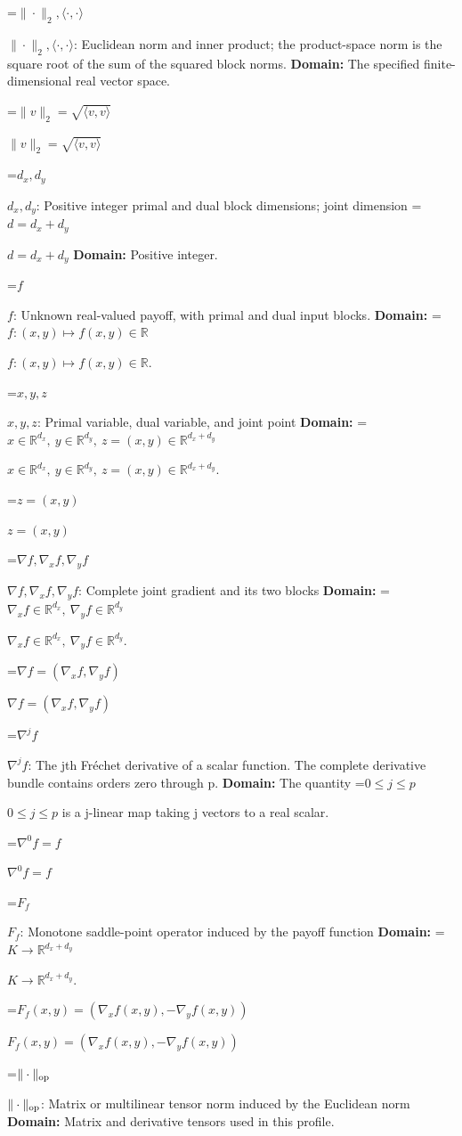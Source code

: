 \documentclass[10pt,a4paper]{article}
\newcommand{\AtlasMath}[1]{\par\begingroup\centering\setbox0=\hbox{$\displaystyle #1$}\ifdim\wd0>1.4\linewidth\typeout{ATLAS WIDE FORMULA: \the\wd0}\fi\ifdim\wd0>\linewidth\resizebox{\linewidth}{!}{\box0}\else\box0\fi\par\endgroup}
\newcommand{\AtlasInlineMath}[1]{\begingroup\setbox0=\hbox{$#1$}\ifdim\wd0>.4\linewidth\endgroup\AtlasMath{#1}\else\endgroup$#1$\fi}
\begin{document}
\AtlasInlineMath{\|\cdot\|_2,\langle\cdot,\cdot\rangle}: Euclidean norm and inner product; the product-space norm is the square root of the sum of the squared block norms. \textbf{Domain:} The specified finite-dimensional real vector space.



\AtlasInlineMath{\|v\|_2=\sqrt{\langle v,v\rangle}}



\AtlasInlineMath{d_x,d_y}: Positive integer primal and dual block dimensions; joint dimension \AtlasInlineMath{d=d_x+d_y} \textbf{Domain:} Positive integer.



\AtlasInlineMath{f}: Unknown real-valued payoff, with primal and dual input blocks. \textbf{Domain:} \AtlasInlineMath{f:(x,y)\mapsto f(x,y)\in\mathbb R}.



\AtlasInlineMath{x,y,z}: Primal variable, dual variable, and joint point \textbf{Domain:} \AtlasInlineMath{x\in\mathbb R^{d_x},\ y\in\mathbb R^{d_y},\ z=(x,y)\in\mathbb R^{d_x+d_y}}.



\AtlasInlineMath{z=(x,y)}



\AtlasInlineMath{\nabla f,\nabla_x f,\nabla_y f}: Complete joint gradient and its two blocks \textbf{Domain:} \AtlasInlineMath{\nabla_x f\in\mathbb R^{d_x},\ \nabla_y f\in\mathbb R^{d_y}}.



\AtlasInlineMath{\nabla f=(\nabla_x f,\nabla_y f)}



\AtlasInlineMath{\nabla^j f}: The jth Fréchet derivative of a scalar function. The complete derivative bundle contains orders zero through p. \textbf{Domain:} The quantity \AtlasInlineMath{0\le j\le p} is a j-linear map taking j vectors to a real scalar.



\AtlasInlineMath{\nabla^0f=f}



\AtlasInlineMath{F_f}: Monotone saddle-point operator induced by the payoff function \textbf{Domain:} \AtlasInlineMath{K\to\mathbb R^{d_x+d_y}}.



\AtlasInlineMath{F_f(x,y)=(\nabla_x f(x,y),-\nabla_y f(x,y))}



\AtlasInlineMath{\|\cdot\|_{\rm op}}: Matrix or multilinear tensor norm induced by the Euclidean norm \textbf{Domain:} Matrix and derivative tensors used in this profile.
\end{document}
